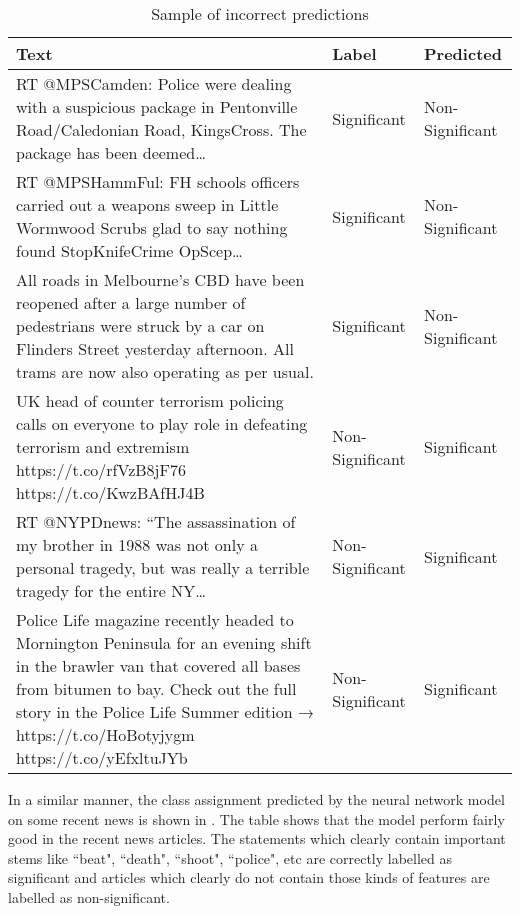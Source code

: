 \begin{table}
\begin{center}
\caption{Sample of incorrect predictions}
\label{tbl:incorrect_predictions}
\begin{tabular}{p{9cm}p{2.5cm}p{2.5cm}}
\toprule 
Text&Label&Predicted\\
\midrule 
RT @MPSCamden: Police were dealing with a suspicious package in Pentonville Road/Caledonian Road, KingsCross. The package has been deemed…&Significant&Non-Significant\\
\hline
RT @MPSHammFul: FH schools officers carried out a weapons sweep in Little Wormwood Scrubs glad to say nothing found StopKnifeCrime OpScep…&Significant&Non-Significant\\
\hline
All roads in Melbourne's CBD have been reopened after a large number of pedestrians were struck by a car on Flinders Street yesterday afternoon. All trams are now also operating as per usual.&Significant&Non-Significant\\
\hline
UK head of counter terrorism policing calls on everyone to play role in defeating terrorism and extremism https://t.co/rfVzB8jF76 https://t.co/KwzBAfHJ4B&Non-Significant&Significant\\
\hline
RT @NYPDnews: “The assassination of my brother in 1988 was not only a personal tragedy, but was really a terrible tragedy for the entire NY…&Non-Significant&Significant\\
\hline
Police Life magazine recently headed to Mornington Peninsula for an evening shift in the brawler van that covered all bases from bitumen to bay. Check out the full story in the Police Life Summer edition → https://t.co/HoBotyjygm https://t.co/yEfxltuJYb&Non-Significant&Significant\\
\bottomrule
\end{tabular}
\end{center}
\end{table}

In a similar manner, the class assignment predicted by the neural network model on some recent news  is shown in . The table shows that the model perform fairly good in the recent news articles. The statements which clearly contain important stems like ``beat", ``death", ``shoot", ``police", etc are correctly labelled as significant and articles which clearly do not contain those kinds of features are labelled as non-significant.

